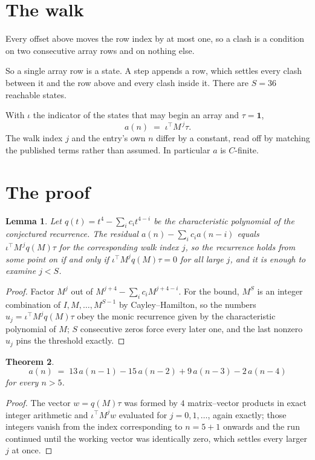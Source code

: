 \documentclass[11pt,a4paper]{article}
\theoremstyle{plain}
\newtheorem{theorem}{Theorem}
\newtheorem{lemma}[theorem]{Lemma}
\theoremstyle{definition}
\begin{document}
\section{The walk}

Every offset above moves the row index by at most one, so a clash is a condition on two
consecutive array rows and on nothing else.

So a single array row is a state. A step appends a row, which settles every clash between it
and the row above and every clash inside it. There are $S=36$ reachable states.

With $\iota$ the indicator of the states that may begin an array and $\tau=\mathbf{1}$,
\[
a(n)\;=\;\iota^{\!\top}M^{\,j}\tau .
\]
The walk index $j$ and the entry's own $n$ differ by a constant, read off by matching the
published terms rather than assumed. In particular $a$ is $C$-finite.

\section{The proof}

\begin{lemma}\label{lem:crit}
Let $q(t)=t^{4}-\sum_i c_it^{4-i}$ be the characteristic polynomial of the
conjectured recurrence. The residual $a(n)-\sum_ic_ia(n-i)$ equals
$\iota^{\!\top}M^{\,j}q(M)\tau$ for the corresponding walk index $j$, so the recurrence
holds from some point on if and only if $\iota^{\!\top}M^{j}q(M)\tau=0$ for all large $j$,
and it is enough to examine $j<S$.
\end{lemma}

\begin{proof}
Factor $M^{j}$ out of $M^{j+4}-\sum_ic_iM^{j+4-i}$. For the bound, $M^{S}$
is an integer combination of $I,M,\dots,M^{S-1}$ by Cayley--Hamilton, so the numbers
$u_j=\iota^{\!\top}M^{j}q(M)\tau$ obey the monic recurrence given by the characteristic
polynomial of $M$; $S$ consecutive zeros force every later one, and the last nonzero $u_j$
pins the threshold exactly.
\end{proof}

\begin{theorem}
\[
a(n)\;=\;13\,a(n-1) - 15\,a(n-2) + 9\,a(n-3) - 2\,a(n-4)
\]
for every $n>5$.
\end{theorem}

\begin{proof}
The vector $w=q(M)\tau$ was formed by $4$ matrix--vector products in exact integer
arithmetic and $\iota^{\!\top}M^{j}w$ evaluated for $j=0,1,\dots$, again exactly; those
integers vanish from the index corresponding to $n=5+1$ onwards and the run continued
until the working vector was identically zero, which settles every larger $j$ at once.
\end{proof}
\end{document}
